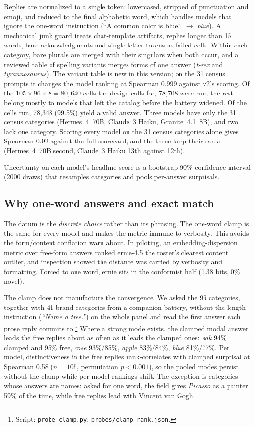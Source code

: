 \documentclass[11pt]{article}
\begin{document}
Replies are normalized to a single token: lowercased, stripped of punctuation and emoji, and reduced to the final alphabetic word, which handles models that ignore the one-word instruction (``A common color is blue.'' $\rightarrow$ \emph{blue}). A mechanical junk guard treats chat-template artifacts, replies longer than 15 words, bare acknowledgments and single-letter tokens as failed cells. Within each category, bare plurals are merged with their singulars when both occur, and a reviewed table of spelling variants merges forms of one answer (\emph{t-rex} and \emph{tyrannosaurus}). The variant table is new in this version; on the 31 census prompts it changes the model ranking at Spearman 0.999 against v2's scoring. Of the $105 \times 96 \times 8 = 80{,}640$ cells the design calls for, 78{,}708 were run; the rest belong mostly to models that left the catalog before the battery widened. Of the cells run, 78{,}348 (99.5\%) yield a valid answer. Three models have only the 31 census categories (Hermes~4~70B, Claude~3 Haiku, Granite~4.1~8B), and two lack one category. Scoring every model on the 31 census categories alone gives Spearman 0.92 against the full scorecard, and the three keep their ranks (Hermes~4~70B second, Claude~3 Haiku 13th against 12th).

Uncertainty on each model's headline score is a bootstrap 90\% confidence interval (2000 draws) that resamples categories and pools per-answer surprisals.

\subsection{Why one-word answers and exact match}
\label{sec:whyoneword}

The datum is the \emph{discrete choice} rather than its phrasing. The one-word clamp is the same for every model and makes the metric immune to verbosity. This avoids the form/content conflation \citet{tevet2021evaluating} warn about. In piloting, an embedding-dispersion metric over free-form answers ranked ernie-4.5 the roster's clearest content outlier, and inspection showed the distance was carried by verbosity and formatting. Forced to one word, ernie sits in the conformist half (1.38 bits, 0\% novel).

The clamp does not manufacture the convergence. We asked the 96 categories, together with 41 brand categories from a companion battery, without the length instruction (\emph{``Name a tree.''}) on the whole panel and read the first answer each prose reply commits to.\footnote{Script: \texttt{probe\_clamp.py}; \texttt{probes/clamp\_rank.json}.} Where a strong mode exists, the clamped modal answer leads the free replies about as often as it leads the clamped ones: \emph{oak} 94\% clamped and 95\% free, \emph{rose} 93\%/85\%, \emph{apple} 83\%/84\%, \emph{blue} 81\%/77\%. Per model, distinctiveness in the free replies rank-correlates with clamped surprisal at Spearman 0.58 ($n = 105$, permutation $p < 0.001$), so the pooled modes persist without the clamp while per-model rankings shift. The exception is categories whose answers are names: asked for one word, the field gives \emph{Picasso} as a painter 59\% of the time, while free replies lead with Vincent van Gogh.
\end{document}
